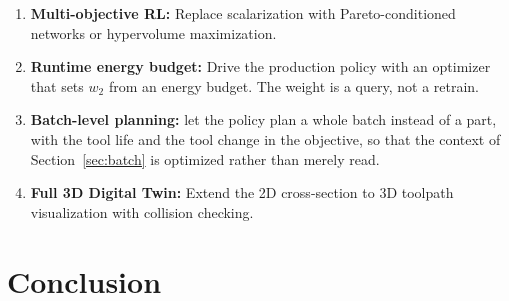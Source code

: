 \documentclass[11pt,a4paper]{article}
\begin{document}
\begin{enumerate}
    \item \textbf{Multi-objective RL:} Replace scalarization with Pareto-conditioned networks or hypervolume maximization.
    \item \textbf{Runtime energy budget:} Drive the production policy with an optimizer that sets $w_2$ from an energy budget. The weight is a query, not a retrain.
    \item \textbf{Batch-level planning:} let the policy plan a whole batch instead of a part, with the tool life and the tool change in the objective, so that the context of Section~\ref{sec:batch} is optimized rather than merely read.
    \item \textbf{Full 3D Digital Twin:} Extend the 2D cross-section to 3D toolpath visualization with collision checking.
\end{enumerate}

\section{Conclusion}
\end{document}
